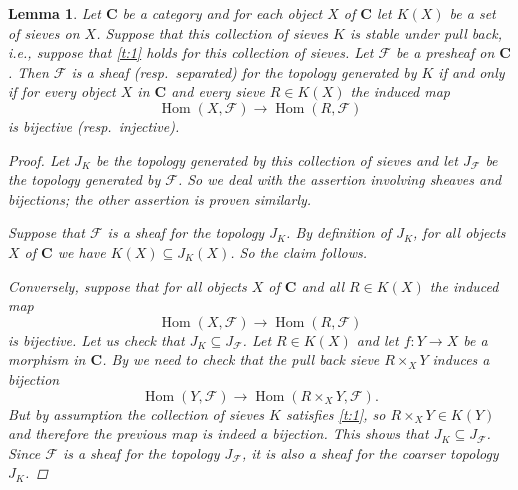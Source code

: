 \documentclass[12pt,reqno,a4paper]{amsart}
\theoremstyle{plain}
\newtheorem{lm}[thm]{Lemma}
\theoremstyle{definition}
\theoremstyle{remark}
\begin{document}
\begin{lm}\label{lm:generated}
  Let $\mathbf{C}$ be a category and for each object $X$ of $\mathbf{C}$ let $K(X)$ be a set of sieves on $X$.
  Suppose that this collection of sieves $K$ is stable under pull back, i.e., suppose that \ref{t:1} holds for this collection of sieves.
  Let $\mathscr{F}$ be a presheaf on $\mathbf{C}$.
  Then $\mathscr{F}$ is a sheaf (resp.~separated) for the topology generated by $K$ if and only if for every object $X$ in $\mathbf{C}$ and every sieve $R \in K(X)$ the induced map
  \[ \operatorname{Hom}(X,\mathscr{F}) \to \operatorname{Hom}(R,\mathscr{F}) \]
  is bijective (resp.~injective).
  \begin{proof}
    Let $J_{K}$ be the topology generated by this collection of sieves and let $J_{\mathscr{F}}$ be the topology generated by $\mathscr{F}$.
    So we deal with the assertion involving sheaves and bijections; the other assertion is proven similarly.

    Suppose that $\mathscr{F}$ is a sheaf for the topology $J_{K}$.
    By definition of $J_{K}$, for all objects $X$ of $\mathbf{C}$ we have $K(X) \subseteq J_{K}(X)$.
    So the claim follows.

    Conversely, suppose that for all objects $X$ of $\mathbf{C}$ and all $R \in K(X)$ the induced map
    \[ \operatorname{Hom}(X,\mathscr{F}) \to \operatorname{Hom}(R,\mathscr{F}) \]
    is bijective.
    Let us check that $J_{K} \subseteq J_{\mathscr{F}}$.
    Let $R \in K(X)$ and let $f \colon Y \to X$ be a morphism in $\mathbf{C}$.
    By  we need to check that the pull back sieve $R \times_{X} Y$ induces a bijection
    \[ \operatorname{Hom}(Y,\mathscr{F}) \to \operatorname{Hom}(R \times_{X} Y, \mathscr{F}). \]
    But by assumption the collection of sieves $K$ satisfies \ref{t:1}, so $R \times_{X} Y \in K(Y)$ and therefore the previous map is indeed a bijection.
    This shows that $J_{K} \subseteq J_{\mathscr{F}}$.
    Since $\mathscr{F}$ is a sheaf for the topology $J_{\mathscr{F}}$, it is also a sheaf for the coarser topology $J_{K}$.
  \end{proof}
\end{lm}
\end{document}
